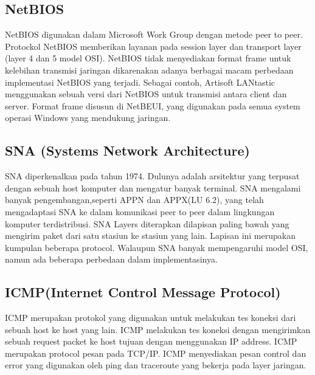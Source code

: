 \subsection{NetBIOS}
NetBIOS digunakan dalam Microsoft Work Group dengan metode peer to peer. Protockol NetBIOS memberikan layanan pada session layer dan 
transport layer (layer 4 dan 5 model OSI). NetBIOS tidak menyediakan format frame untuk kelebihan transmisi jaringan dikarenakan adanya 
berbagai macam perbedaan implementasi NetBIOS yang terjadi. Sebagai contoh, Artisoft LANtastic menggunakan sebuah versi dari NetBIOS 
untuk transmisi antara client dan server. Format frame disusun di NetBEUI, yang digunakan pada semua system operasi Windows yang 
mendukung jaringan.

\subsection{SNA (Systems Network Architecture)}
SNA diperkenalkan pada tahun 1974. Dulunya adalah arsitektur yang terpusat dengan sebuah host komputer dan mengatur banyak terminal. 
SNA mengalami banyak pengembangan,seperti APPN dan APPX(LU 6.2), yang telah mengadaptasi SNA ke dalam komunikasi peer to peer dalam 
lingkungan komputer terdistribusi. SNA Layers diterapkan dilapisan paling bawah yang mengirim paket dari satu stasiun ke stasiun yang 
lain. Lapisan ini merupakan kumpulan beberapa protocol. Walaupun SNA banyak mempengaruhi model OSI, namun ada beberapa perbedaan dalam 
implementasinya.

\subsection{ICMP(Internet Control Message Protocol)}
ICMP merupakan protokol yang digunakan untuk melakukan tes koneksi dari sebuah host ke host yang lain.
ICMP melakukan tes koneksi dengan mengirimkan sebuah request packet ke host tujuan dengan menggunakan IP address.
ICMP merupakan protocol pesan pada TCP/IP. ICMP menyediakan pesan control dan error yang digunakan oleh ping dan traceroute yang bekerja pada layer jaringan.

